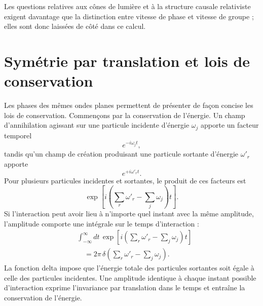 \begin{classroomqa}
\end{classroomqa}

Les questions relatives aux cônes de lumière et à la structure causale relativiste exigent davantage que la distinction entre vitesse de phase et vitesse de groupe ; elles sont donc laissées de côté dans ce calcul.

\section{Symétrie par translation et lois de conservation}

Les phases des mêmes ondes planes permettent de présenter de façon concise les lois de conservation. Commençons par la conservation de l’énergie. Un champ d’annihilation agissant sur une particule incidente d’énergie \(\omega_j\) apporte un facteur temporel
\begin{equation}
e^{-i\omega_j t},
\end{equation}
tandis qu’un champ de création produisant une particule sortante d’énergie \(\omega'_r\) apporte
\begin{equation}
e^{+i\omega'_r t}.
\end{equation}
Pour plusieurs particules incidentes et sortantes, le produit de ces facteurs est
\begin{equation}
\exp\!\left[
i\left(\sum_r\omega'_r-\sum_j\omega_j\right)t
\right].
\end{equation}
Si l’interaction peut avoir lieu à n’importe quel instant avec la même amplitude, l’amplitude comporte une intégrale sur le temps d’interaction :
\begin{equation}
\begin{aligned}
&\int_{-\infty}^{\infty}dt\,
\exp\!\left[
i\left(\sum_r\omega'_r-\sum_j\omega_j\right)t
\right]
\\
&\quad =2\pi\,
\delta\!\left(\sum_r\omega'_r-\sum_j\omega_j\right).
\end{aligned}
\end{equation}
La fonction delta impose que l’énergie totale des particules sortantes soit égale à celle des particules incidentes. Une amplitude identique à chaque instant possible d’interaction exprime l’invariance par translation dans le temps et entraîne la conservation de l’énergie.

